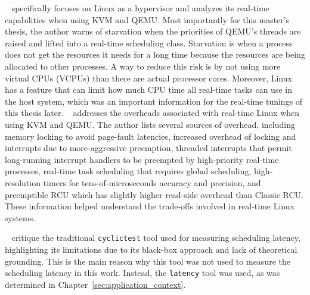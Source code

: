 \documentclass[MMR,Master,english]{twbook}
\begin{document}
\bigskip \noindent \citeauthor{kiszkaLinuxRealTimeHypervisor}~\cite{kiszkaLinuxRealTimeHypervisor} specifically focuses on Linux as a hypervisor and analyzes its real-time capabilities when using KVM and QEMU. Most importantly for this master's thesis, the author warns of starvation when the priorities of QEMU’s threads are raised and lifted into a real-time scheduling class. Starvation is when a process does not get the resources it needs for a long time because the resources are being allocated to other processes. A way to reduce this risk is by not using more virtual CPUs (VCPUs) than there are actual processor cores. Moreover, Linux has a feature that can limit how much CPU time all real-time tasks can use in the host system, which was an important information for the real-time tunings of this thesis later.
\clearpage
\bigskip \noindent \citeauthor{mckenneyRealTimeVs}~\cite{mckenneyRealTimeVs} addresses the overheads associated with real-time Linux when using KVM and QEMU. The author lists several sources of overhead, including memory locking to avoid page-fault latencies, increased overhead of locking and interrupts due to more-aggressive preemption, threaded interrupts that permit long-running interrupt handlers to be preempted by high-priority real-time processes, real-time task scheduling that requires global scheduling, high-resolution timers for tens-of-microseconds accuracy and precision, and preemptible RCU which has slightly higher read-side overhead than Classic RCU. These information helped understand the trade-offs involved in real-time Linux systems.

\bigskip \noindent \citeauthor{deoliveiraDemystifyingRealTimeLinux}~\cite{deoliveiraDemystifyingRealTimeLinux} critique the traditional \texttt{cyclictest} tool used for measuring scheduling latency, highlighting its limitations due to its black-box approach and lack of theoretical grounding. This is the main reason why this tool was not used to measure the scheduling latency in this work. Instead, the \texttt{latency} tool was used, as was determined in Chapter~\ref{sec:application_context}.
\end{document}
